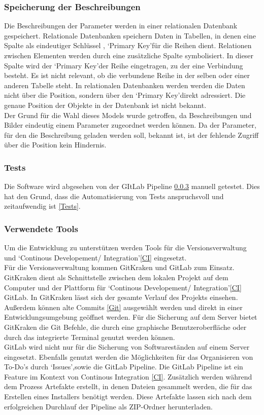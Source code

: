 \documentclass[12pt,a4paper]{article}
\begin{document}
\subsubsection{Speicherung der Beschreibungen}
Die Beschreibungen der Parameter werden in einer relationalen Datenbank gespeichert. Relationale Datenbanken speichern Daten in Tabellen, in denen eine Spalte als eindeutiger Schlüssel , \lq Primary Key\rq\space für die Reihen dient. Relationen zwischen Elementen werden durch eine zusätzliche Spalte symbolisiert. In dieser Spalte wird der \lq Primary Key\rq\space der Reihe eingetragen, zu der eine Verbindung besteht. Es ist nicht relevant, ob die verbundene Reihe in der selben oder einer anderen Tabelle steht. In relationalen Datenbanken werden werden die Daten nicht über die Position, sondern über den \lq Primary Key\rq\space direkt adressiert. Die genaue Position der Objekte in der Datenbank ist nicht bekannt\cite{10.1145/1283920.1283937}.\\
Der Grund für die Wahl dieses Models wurde getroffen, da Beschreibungen und Bilder eindeutig einem Parameter zugeordnet werden können. Da der Parameter, für den die Beschreibung geladen werden soll, bekannt ist, ist der fehlende Zugriff über die Position kein Hindernis.
\subsubsection{Tests}
Die Software wird abgesehen von der GItLab Pipeline \ref{Tools} manuell getestet. Dies hat den Grund, dass die Automatisierung von Tests anspruchsvoll und zeitaufwendig ist \ref{Tests}.
\subsubsection{Verwendete Tools}
\label{Tools}
Um die Entwicklung zu unterstützen werden Tools für die Versionsverwaltung und \lq Continous Developement/ Integration\rq\space \ref{CI} eingesetzt.\\
Für die Versionsverwaltung kommen GitKraken und GitLab zum Einsatz. GitKraken dient als Schnittstelle zwischen dem lokalen Projekt auf dem Computer und der Plattform für \lq Continous Developement/ Integration\rq\space \ref{CI} GitLab. In GitKraken lässt sich der gesamte Verlauf des Projekts einsehen. Außerdem können alte Commits \ref{Git} ausgewählt werden und direkt in einer Entwicklungsumgebung geöffnet werden. Für die Sicherung auf dem Server bietet GitKraken die Git Befehle, die durch eine graphische Benutzeroberfläche oder durch das integrierte Terminal genutzt werden können.\\
GitLab wird nicht nur für die Sicherung von Softwareständen auf einem Server eingesetzt. Ebenfalls genutzt werden die Möglichkeiten für das Organisieren von To-Do's durch \lq Issues\rq ,\space sowie die GitLab Pipeline. Die GitLab Pipeline ist ein Feature im Kontext von Continous Integration \ref{CI}. Zusätzlich werden während dem Prozess Artefakte erstellt, in denen Dateien gesammelt werden, die für das Erstellen eines Installers benötigt werden. Diese Artefakte lassen sich nach dem erfolgreichen Durchlauf der Pipeline als ZIP-Ordner herunterladen.\\
\end{document}
